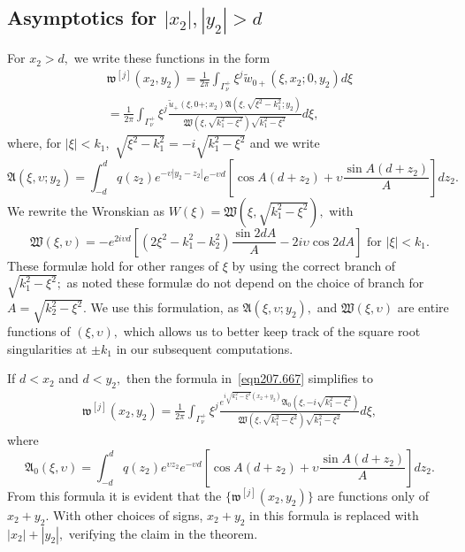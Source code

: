 \documentclass[11pt]{article}
\newcommand\fw{\mathfrak w}
\newcommand\fW{\mathfrak W}
\newcommand\fA{\mathfrak A}
\newcommand\tu{\widetilde u}
\newcommand\tw{\tilde w_{0+}}
\theoremstyle{definition}
\theoremstyle{remark}
\begin{document}
\subsection{Asymptotics for $|x_2|,|y_2|>d$}\label{sec6.1}
For $x_2>d,$ we write these functions in the form
\begin{multline}\label{eqn207.667}
    \fw^{[j]}(x_2,y_2)=\frac{1}{2\pi}\int_{\Gamma_{\nu}^+}\xi^j\tw(\xi,x_2;0,y_2)d\xi\\ =\frac{1}{2\pi}\int_{\Gamma_{\nu}^+}\xi^j\frac{\tu_+(\xi,0+;x_2)\fA(\xi,\sqrt{\xi^2-k_1^2};y_2)}{\fW(\xi,\sqrt{k_1^2-\xi^2})\sqrt{k_1^2-\xi^2}}d\xi,
\end{multline}
where, for $|\xi|<k_1,$ $\sqrt{\xi^2-k_1^2}=-i\sqrt{k_1^2-\xi^2}$ and we write
\begin{equation}
  \fA(\xi,\upsilon;y_2)=\int_{-d}^{d}q(z_2)e^{-\upsilon|y_2-z_2|}
  e^{-\upsilon d}\left[\cos A(d+z_2)+\upsilon\frac{\sin A(d+z_2)}{A}\right]dz_2.
\end{equation}
We rewrite the Wronskian as $W(\xi)=\fW(\xi,\sqrt{k_1^2-\xi^2}),$ with
\begin{equation}
  \fW(\xi,\upsilon)=-e^{2i \upsilon d}\left[(2\xi^2-k_1^2-k_2^2)\frac{\sin 2d A}{A}-2i\upsilon\cos
      2dA\right]\text{ for }|\xi|<k_1.
\end{equation}
These formul{\ae} hold for other ranges of $\xi$ by using the correct
branch of $\sqrt{k_1^2-\xi^2};$ as noted these formul{\ae} do not
depend on the choice of branch for $A=\sqrt{k_2^2-\xi^2}.$ We use this
formulation, as $\fA(\xi,\upsilon;y_2), $ and $\fW(\xi,\upsilon)$ are entire
functions of $(\xi,\upsilon),$ which allows us to better keep track of the
square root singularities at $\pm k_1$ in our subsequent computations.


If $d<x_2$ and $d<y_2,$ then the formula in~\eqref{eqn207.667} simplifies to
\begin{multline}\label{eqn98.201}
  \fw^{[j]}(x_2,y_2)=\frac{1}{2\pi}\int_{\Gamma_{\nu}^+}\xi^j
  \frac{e^{i\sqrt{k_1^2-\xi^2}(x_2+y_2)}\fA_0(\xi,-i\sqrt{k_1^2-\xi^2})}
  {\fW(\xi,\sqrt{k_1^2-\xi^2})\sqrt{k_1^2-\xi^2}}d\xi,
\end{multline}
where
\begin{equation}
  \fA_0(\xi,\upsilon)=\int_{-d}^{d}q(z_2)e^{\upsilon z_2}
  e^{-\upsilon d}\left[\cos A(d+z_2)+\upsilon\frac{\sin A(d+z_2)}{A}\right]dz_2.
\end{equation}
From this formula it is evident that the $ \{\fw^{[j]}(x_2,y_2)\}$ are functions only of
$x_2+y_2.$ With other choices of signs, $x_2+y_2$ in this formula is replaced
with $|x_2|+|y_2|,$ verifying the claim in the theorem.
\end{document}

